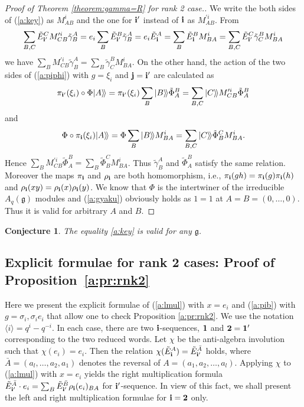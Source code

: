 \documentclass[11pt]{article}
\newtheorem{conjecture}{Conjecture}
\newcommand{\geh}{\mathfrak{g}}
\def\qmq#1{\langle #1 \rangle}
\begin{document}
\begin{proof}[Proof of Theorem \ref{theorem:gamma=R} for rank 2 case.]
We write the both sides of (\ref{a:key}) as $M^i_{AB}$ and the one
for ${\bf i}'$ instead of ${\bf i}$ as $M^{\prime i}_{AB}$.
From
\begin{gather*}
\sum_{B,C} {\tilde E}^C_{{\bf i}'} M^{\prime i}_{CB}{\tilde \gamma}^A_B=
e_i \sum_B {\tilde E}^B_{{\bf i}'}{\tilde \gamma}^A_B =
e_i {\tilde E}^A_{\bf i} = \sum_B {\tilde E}^{B}_{\bf i}  M^i_{BA}
= \sum_{B,C}{\tilde E}^C_{{\bf i}'}
{\tilde \gamma}^B_C M^i_{BA}
\end{gather*}
we have
$\sum_{B} M^{\prime i}_{CB}{\tilde \gamma}^A_B
= \sum_{B}{\tilde \gamma}^B_CM^i_{BA}$.
On the other hand, the action of the two sides of (\ref{a:piphi}) with
$g=\xi_i$ and
${\bf j}={\bf i}'$ are calculated as
\[
\pi_{{\bf i}'}(\xi_i)\circ \Phi|A\rangle\!\rangle
=\pi_{{\bf i}'}(\xi_i)\sum_B|B\rangle\!\rangle{\tilde \Phi}^B_A
=\sum_{B,C}|C\rangle\!\rangle
M_{CB}^{\prime i}{\tilde \Phi}_A^B
\]
and
\[
\Phi \circ \pi_{{\bf i}}(\xi_i)|A\rangle\!\rangle
=\Phi\sum_B|B\rangle\!\rangle M_{BA}^i
=\sum_{B,C}|C\rangle\!\rangle {\tilde \Phi}_B^C M_{BA}^i.
\]
Hence
$\sum_{B}
M_{CB}^{\prime i}{\tilde \Phi}_A^B
= \sum_{B}{\tilde \Phi}_B^C M_{BA}^i$.
Thus ${\tilde \gamma}^A_B$ and ${\tilde \Phi}^B_A$
satisfy the same relation.
Moreover the maps $\pi_{\bf i}$ and
$\rho_{\bf i}$ are both homomorphism, i.e.,
$\pi_{\bf i}(gh)=\pi_{\bf i}(g)\pi_{\bf i}(h)$
and
$\rho_{\bf i}(xy)=\rho_{\bf i}(x)\rho_{\bf i}(y)$.
We know that ${\Phi}$ is the intertwiner of the
irreducible $A_q(\geh)$ modules and
(\ref{a:gyaku}) obviously holds as $1=1$ at
$A=B=(0,\ldots,0)$.
Thus it is valid for arbitrary $A$ and $B$.
\end{proof}

\begin{conjecture}
The equality \eqref{a:key} is valid for any $\geh$.
\end{conjecture}

\subsection{Explicit formulae for rank 2 cases:
Proof of Proposition~\ref{a:pr:rnk2}}\label{a:ss:rank2}

Here we present the explicit formulae of
(\ref{a:lmul}) with $x=e_i$
and (\ref{a:pib}) with $g=\sigma_i, \sigma_ie_i$ that allow one to check
Proposition \ref{a:pr:rnk2}.
We use the notation $\qmq{i}=q^i-q^{-i}$.
In each case, there are two ${\bf i}$-sequences,
${\bf 1}$ and ${\bf 2}={\bf 1}'$
corresponding to the two reduced words.
Let $\chi$ be the anti-algebra involution
such that $\chi(e_i)=e_i$.
Then the relation
$\chi({\tilde E}^{A}_{\bf i}) = {\tilde E}^{\bar A}_{{\bf i}'}$ holds,
where ${\bar A} = (a_l,\ldots, a_2,a_1)$ denotes the reversal of
$A=(a_1,a_2,\ldots, a_l)$.
Applying $\chi$ to (\ref{a:lmul}) with $x=e_i$ yields the
right multiplication formula
${\tilde E}^{\bar A}_{{\bf i}'}\cdot e_i  = \sum_B  {\tilde E}^{\bar B}_{{\bf i}'}
\rho_{\bf i}(e_i)_{BA}$ for ${\bf i}'$-sequence.
In view of this fact, we shall present
the left and right multiplication formulae
for ${\bf i}={\bf 2}$ only.
\end{document}
